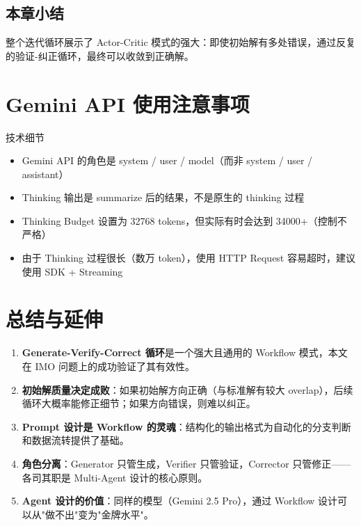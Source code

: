 \documentclass[a4paper]{article}
\begin{document}
\subsection{本章小结}

整个迭代循环展示了 Actor-Critic 模式的强大：即使初始解有多处错误，通过反复的验证-纠正循环，最终可以收敛到正确解。

\section{Gemini API 使用注意事项}

\begin{knowledgebox}{技术细节}
\begin{itemize}
    \item Gemini API 的角色是 system / user / model（而非 system / user / assistant）
    \item Thinking 输出是 summarize 后的结果，不是原生的 thinking 过程
    \item Thinking Budget 设置为 32768 tokens，但实际有时会达到 34000+（控制不严格）
    \item 由于 Thinking 过程很长（数万 token），使用 HTTP Request 容易超时，建议使用 SDK + Streaming
\end{itemize}
\end{knowledgebox}

\section{总结与延伸}

\begin{enumerate}
    \item \textbf{Generate-Verify-Correct 循环}是一个强大且通用的 Workflow 模式，本文在 IMO 问题上的成功验证了其有效性。
    \item \textbf{初始解质量决定成败}：如果初始解方向正确（与标准解有较大 overlap），后续循环大概率能修正细节；如果方向错误，则难以纠正。
    \item \textbf{Prompt 设计是 Workflow 的灵魂}：结构化的输出格式为自动化的分支判断和数据流转提供了基础。
    \item \textbf{角色分离}：Generator 只管生成，Verifier 只管验证，Corrector 只管修正——各司其职是 Multi-Agent 设计的核心原则。
    \item \textbf{Agent 设计的价值}：同样的模型（Gemini 2.5 Pro），通过 Workflow 设计可以从"做不出"变为"金牌水平"。
\end{enumerate}
\end{document}
